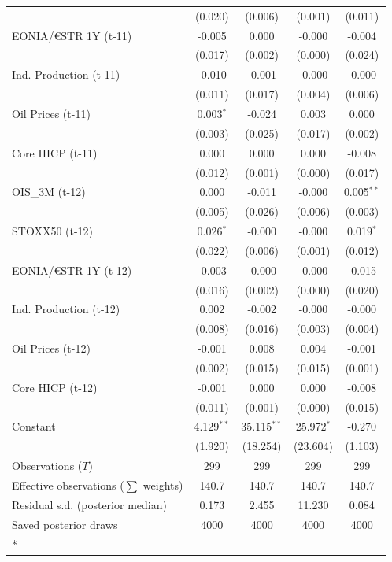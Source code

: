\begin{longtable}[t]{lcccc}
 & (0.020) & (0.006) & (0.001) & (0.011)\\
EONIA/€STR 1Y (t-11) & -0.005 & 0.000 & -0.000 & -0.004\\
 & (0.017) & (0.002) & (0.000) & (0.024)\\
Ind. Production (t-11) & -0.010 & -0.001 & -0.000 & -0.000\\
 & (0.011) & (0.017) & (0.004) & (0.006)\\
Oil Prices (t-11) & 0.003$^{*}$ & -0.024 & 0.003 & 0.000\\
 & (0.003) & (0.025) & (0.017) & (0.002)\\
Core HICP (t-11) & 0.000 & 0.000 & 0.000 & -0.008\\
 & (0.012) & (0.001) & (0.000) & (0.017)\\
OIS\_3M (t-12) & 0.000 & -0.011 & -0.000 & 0.005$^{**}$\\
 & (0.005) & (0.026) & (0.006) & (0.003)\\
STOXX50 (t-12) & 0.026$^{*}$ & -0.000 & -0.000 & 0.019$^{*}$\\
 & (0.022) & (0.006) & (0.001) & (0.012)\\
EONIA/€STR 1Y (t-12) & -0.003 & -0.000 & -0.000 & -0.015\\
 & (0.016) & (0.002) & (0.000) & (0.020)\\
Ind. Production (t-12) & 0.002 & -0.002 & -0.000 & -0.000\\
 & (0.008) & (0.016) & (0.003) & (0.004)\\
Oil Prices (t-12) & -0.001 & 0.008 & 0.004 & -0.001\\
 & (0.002) & (0.015) & (0.015) & (0.001)\\
Core HICP (t-12) & -0.001 & 0.000 & 0.000 & -0.008\\
 & (0.011) & (0.001) & (0.000) & (0.015)\\
Constant & 4.129$^{**}$ & 35.115$^{**}$ & 25.972$^{*}$ & -0.270\\
 & (1.920) & (18.254) & (23.604) & (1.103)\\
\midrule
Observations ($T$) & 299 & 299 & 299 & 299\\
Effective observations ($\sum$ weights) & 140.7 & 140.7 & 140.7 & 140.7\\
Residual s.d. (posterior median) & 0.173 & 2.455 & 11.230 & 0.084\\
Saved posterior draws & 4000 & 4000 & 4000 & 4000\\*
\end{longtable}
\endgroup{}

\begingroup\fontsize{7}{9}\selectfont

